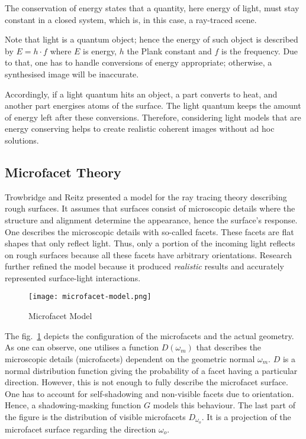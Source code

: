 The conservation of energy states that a quantity, here energy of light, must stay constant in a closed system, which is, in this case, a ray-traced scene.

Note that light is a quantum object; hence the energy of such object is described by $E = h \cdot f$ where $E$ is energy, $h$ the Plank constant and $f$ is the frequency.
Due to that, one has to handle conversions of energy appropriate; otherwise, a synthesised image will be inaccurate.

Accordingly, if a light quantum hits an object, a part converts to heat, and another part energises atoms of the surface.
The light quantum keeps the amount of energy left after these conversions.
Therefore, considering light models that are energy conserving helps to create realistic coherent images without ad hoc solutions.

\subsection*{Microfacet Theory}

Trowbridge and Reitz \cite{trowbridge_average_1975} presented a model for the ray tracing theory describing rough surfaces.
It assumes that surfaces consist of microscopic details where the structure and alignment determine the appearance, hence the surface's response.
One describes the microscopic details with so-called facets.
These facets are flat shapes that only reflect light.
Thus, only a portion of the incoming light reflects on rough surfaces because all these facets have arbitrary orientations.
Research further refined the model because it produced \textit{realistic} results and accurately represented surface-light interactions.

\begin{figure}[h]
    \begin{center}
        \texttt{[image: microfacet-model.png]}
    \end{center}
    \caption[]{Microfacet Model \cite{heitz_understanding_2014}}
    \label{fig:microfacet-normal}
\end{figure}

The fig.~\ref{fig:microfacet-normal} depicts the configuration of the microfacets and the actual geometry.
As one can observe, one utilises a function $D(\omega_m)$ that describes the microscopic details (microfacets) dependent on the geometric normal $\omega_m$.
$D$ is a normal distribution function giving the probability of a facet having a particular direction.
However, this is not enough to fully describe the microfacet surface.
One has to account for self-shadowing and non-visible facets due to orientation.
Hence, a shadowing-masking function $G$ models this behaviour.
The last part of the figure is the distribution of visible microfacets $D_{\omega_o}$.
It is a projection of the microfacet surface regarding the direction $\omega_o$.


